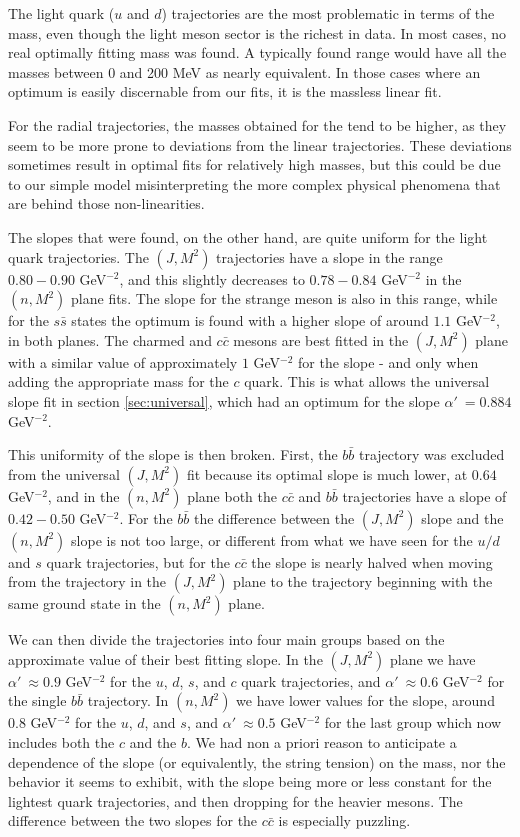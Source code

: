 \documentclass[11pt,a4]{article}
\newcommand{\alp}{\ensuremath{\alpha'\:}}
\newcommand{\ssb}{s\bar{s}}
\newcommand{\ccb}{c\bar{c}}
\newcommand{\bbb}{b\bar{b}}
\begin{document}
The light quark (\(u\) and \(d\)) trajectories are the most problematic in terms of the mass, even though the light meson sector is the richest in data. In most cases, no real optimally fitting mass was found. A typically found range would have all the masses between 0 and 200 MeV as nearly equivalent. In those cases where an optimum is easily discernable from our fits, it is the massless linear fit.


For the radial trajectories, the masses obtained for the tend to be higher, as they seem to be more prone to deviations from the linear trajectories. These deviations sometimes result in optimal fits for relatively high masses, but this could be due to our simple model misinterpreting the more complex physical phenomena that are behind those non-linearities.


The slopes that were found, on the other hand, are quite uniform for the light quark trajectories. The \((J,M^2)\) trajectories have a slope in the range \(0.80-0.90\) GeV\(^{-2}\), and this slightly decreases to \(0.78-0.84\) GeV\(^{-2}\) in the \((n,M^2)\) plane fits. The slope for the strange meson is also in this range, while for the \(\ssb\) states the optimum is found with a higher slope of around \(1.1\) GeV\(^{-2}\), in both planes. The charmed and \(\ccb\) mesons are best fitted in the \((J,M^2)\) plane with a similar value of approximately \(1\) GeV\(^{-2}\) for the slope - and only when adding the appropriate mass for the \(c\) quark. This is what allows the universal slope fit in section \ref{sec:universal}, which had an optimum for the slope \(\alp = 0.884\) GeV\(^{-2}\).


This uniformity of the slope is then broken. First, the \(\bbb\) trajectory was excluded from the universal \((J,M^2)\) fit because its optimal slope is much lower, at \(0.64\) GeV\(^{-2}\), and in the \((n,M^2)\) plane both the \(\ccb\) and \(\bbb\) trajectories have a slope of \(0.42-0.50\) GeV\(^{-2}\). For the \(\bbb\) the difference between the \((J,M^2)\) slope and the \((n,M^2)\) slope is not too large, or different from what we have seen for the \(u/d\) and \(s\) quark trajectories, but for the \(\ccb\) the slope is nearly halved when moving from the trajectory in the \((J,M^2)\) plane to the trajectory beginning with the same ground state in the \((n,M^2)\) plane.


We can then divide the trajectories into four main groups based on the approximate value of their best fitting slope. In the \((J,M^2)\) plane we have \(\alp \approx 0.9\) GeV\(^{-2}\) for the \(u\), \(d\), \(s\), and \(c\) quark trajectories, and \(\alp \approx 0.6\) GeV\(^{-2}\) for the single \(\bbb\) trajectory. In \((n,M^2)\) we have lower values for the slope, around \(0.8\) GeV\(^{-2}\) for the \(u\), \(d\), and \(s\), and \(\alp \approx 0.5\) GeV\(^{-2}\) for the last group which now includes both the \(c\) and the \(b\). We had non a priori reason to anticipate a dependence of the slope (or equivalently, the string tension) on the mass, nor the behavior it seems to exhibit, with the slope being more or less constant for the lightest quark trajectories, and then dropping for the heavier mesons. The difference between the two slopes for the \(\ccb\) is especially puzzling.
\end{document}

